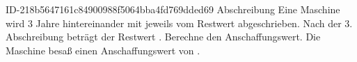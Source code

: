 \begin{exercise}
      {ID-218b5647161c84900988f5064bba4fd769dded69}
      {Abschreibung}
  \ifproblem\problem
    Eine Maschine wird 3 Jahre hintereinander mit jeweils
     vom Restwert abgeschrieben. Nach der 3.
    Abschreibung beträgt der Restwert . Berechne den
    Anschaffungswert.
  \fi
  \ifoutcome\outcome
    Die Maschine besaß einen Anschaffungswert von .
  \fi
\end{exercise}
